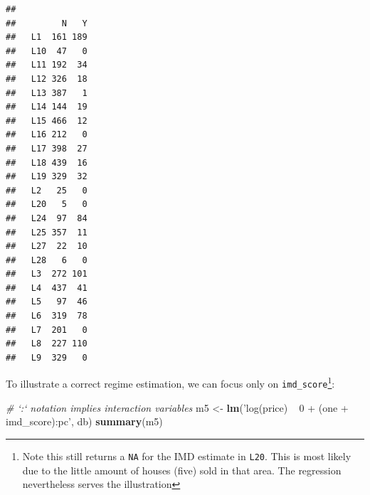 \documentclass[
]{book}
\newenvironment{Shaded}{\begin{snugshade}}{\end{snugshade}}
\newcommand{\CommentTok}[1]{\textcolor[rgb]{0.56,0.35,0.01}{\textit{#1}}}
\newcommand{\KeywordTok}[1]{\textcolor[rgb]{0.13,0.29,0.53}{\textbf{#1}}}
\newcommand{\NormalTok}[1]{#1}
\newcommand{\OperatorTok}[1]{\textcolor[rgb]{0.81,0.36,0.00}{\textbf{#1}}}
\newcommand{\StringTok}[1]{\textcolor[rgb]{0.31,0.60,0.02}{#1}}
\begin{document}
\begin{Shaded}
\end{Shaded}

\begin{verbatim}
##      
##         N   Y
##   L1  161 189
##   L10  47   0
##   L11 192  34
##   L12 326  18
##   L13 387   1
##   L14 144  19
##   L15 466  12
##   L16 212   0
##   L17 398  27
##   L18 439  16
##   L19 329  32
##   L2   25   0
##   L20   5   0
##   L24  97  84
##   L25 357  11
##   L27  22  10
##   L28   6   0
##   L3  272 101
##   L4  437  41
##   L5   97  46
##   L6  319  78
##   L7  201   0
##   L8  227 110
##   L9  329   0
\end{verbatim}

To illustrate a correct regime estimation, we can focus only on \texttt{imd\_score}\footnote{Note this still returns a \texttt{NA} for the IMD estimate in \texttt{L20}. This is most likely due to the little amount of houses (five) sold in that area. The regression nevertheless serves the illustration}:

\begin{Shaded}
\begin{Highlighting}[]
\CommentTok{# `:` notation implies interaction variables}
\NormalTok{m5 <-}\StringTok{ }\KeywordTok{lm}\NormalTok{(}\StringTok{'log(price) ~ 0 + (one + imd_score):pc'}\NormalTok{, db)}
\KeywordTok{summary}\NormalTok{(m5)}
\end{Highlighting}
\end{Shaded}
\end{document}
